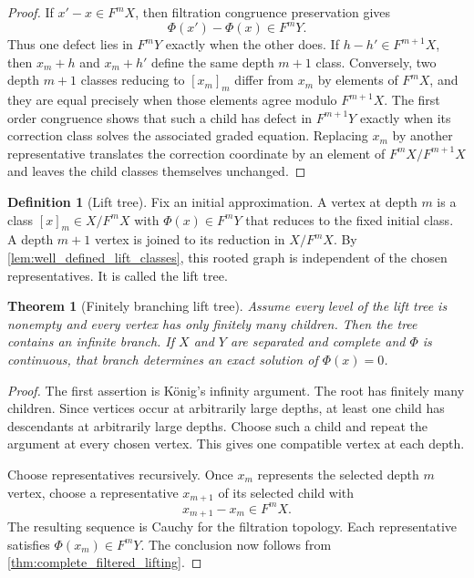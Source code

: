 \documentclass{aomart}
\newtheorem{theorem}{Theorem}[section]
\theoremstyle{definition}
\newtheorem{definition}[definition]{Definition}
\theoremstyle{remark}
\begin{document}
\begin{proof}
If $x'-x\in F^mX$, then filtration congruence preservation gives
\[
\Phi(x')-\Phi(x)\in F^mY.
\]
Thus one defect lies in $F^mY$ exactly when the other does.  If $h-h'\in F^{m+1}X$, then $x_m+h$ and $x_m+h'$ define the same depth $m+1$ class.  Conversely, two depth $m+1$ classes reducing to $[x_m]_m$ differ from $x_m$ by elements of $F^mX$, and they are equal precisely when those elements agree modulo $F^{m+1}X$.  The first order congruence shows that such a child has defect in $F^{m+1}Y$ exactly when its correction class solves the associated graded equation.  Replacing $x_m$ by another representative translates the correction coordinate by an element of $F^mX/F^{m+1}X$ and leaves the child classes themselves unchanged.
\end{proof}

\begin{definition}[Lift tree]\label{def:lift_tree}
Fix an initial approximation.  A vertex at depth $m$ is a class $[x]_m\in X/F^mX$ with $\Phi(x)\in F^mY$ that reduces to the fixed initial class.  A depth $m+1$ vertex is joined to its reduction in $X/F^mX$.  By \cref{lem:well_defined_lift_classes}, this rooted graph is independent of the chosen representatives.  It is called the lift tree.
\end{definition}

\begin{theorem}[Finitely branching lift tree]\label{thm:finitely_branching_lift_tree}
Assume every level of the lift tree is nonempty and every vertex has only finitely many children.  Then the tree contains an infinite branch.  If $X$ and $Y$ are separated and complete and $\Phi$ is continuous, that branch determines an exact solution of $\Phi(x)=0$.
\end{theorem}

\begin{proof}
The first assertion is K\"onig's infinity argument.  The root has finitely many children.  Since vertices occur at arbitrarily large depths, at least one child has descendants at arbitrarily large depths.  Choose such a child and repeat the argument at every chosen vertex.  This gives one compatible vertex at each depth.

Choose representatives recursively.  Once $x_m$ represents the selected depth $m$ vertex, choose a representative $x_{m+1}$ of its selected child with
\[
x_{m+1}-x_m\in F^mX.
\]
The resulting sequence is Cauchy for the filtration topology.  Each representative satisfies $\Phi(x_m)\in F^mY$.  The conclusion now follows from \cref{thm:complete_filtered_lifting}.
\end{proof}
\end{document}
